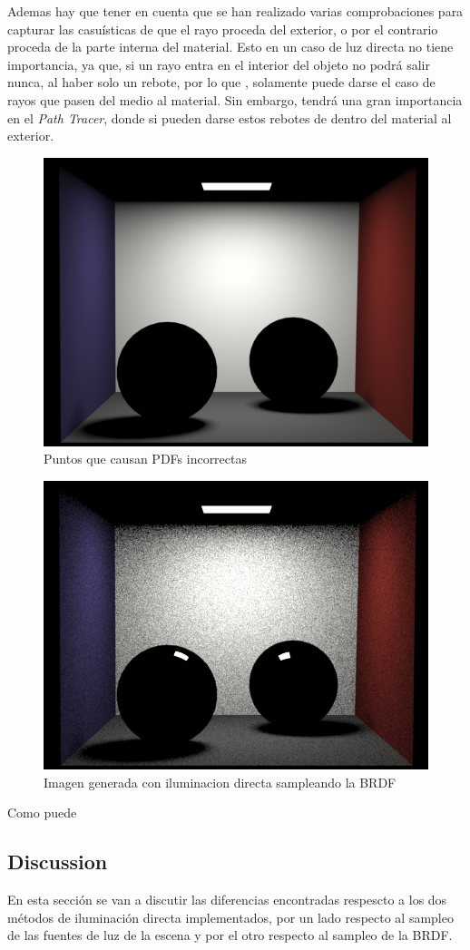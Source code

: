 \documentclass[10pt,oneside,a4paper]{article}
\begin{document}
Ademas hay que tener en cuenta que se han realizado varias comprobaciones para capturar las casuísticas de que el rayo proceda del exterior, o por el contrario proceda de la parte interna del material. Esto en un caso de luz directa no tiene importancia, ya que, si un rayo entra en el interior del objeto no podrá salir nunca, al haber solo un rebote, por lo que , solamente puede darse el caso de rayos que pasen del medio al  material. Sin embargo, tendrá una gran importancia en el \textit{Path Tracer}, donde si pueden darse estos rebotes de dentro del material al exterior.
 
 \begin{figure}[h]
\centering
\includegraphics[width=.6\linewidth]{images/cbox_direct_ems_comlex_512.png}
\caption{Puntos que causan PDFs incorrectas}
\label{fig:disp}
\end{figure}

\begin{figure}[h]
\centering
\includegraphics[width=.6\linewidth]{images/cbox_direct_mats_complex_512.png}
\caption{Imagen generada con iluminacion directa sampleando la BRDF}
\label{fig:disp}
\end{figure}

Como puede 
 
 \subsection{Discussion}
 En esta sección se van a discutir las diferencias encontradas respescto a los dos métodos de iluminación directa implementados, por un lado respecto al sampleo de las fuentes de luz de la escena y por el otro respecto al sampleo de la BRDF.\\
 
\end{document}
